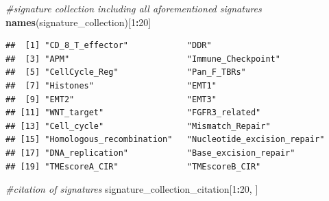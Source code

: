 \documentclass[
  12pt,
]{book}
\newenvironment{Shaded}{\begin{snugshade}}{\end{snugshade}}
\newcommand{\CommentTok}[1]{\textcolor[rgb]{0.56,0.35,0.01}{\textit{#1}}}
\newcommand{\DecValTok}[1]{\textcolor[rgb]{0.00,0.00,0.81}{#1}}
\newcommand{\FunctionTok}[1]{\textcolor[rgb]{0.13,0.29,0.53}{\textbf{#1}}}
\newcommand{\NormalTok}[1]{#1}
\newcommand{\SpecialCharTok}[1]{\textcolor[rgb]{0.81,0.36,0.00}{\textbf{#1}}}
\theoremstyle{definition}
\theoremstyle{definition}
\theoremstyle{definition}
\theoremstyle{definition}
\theoremstyle{remark}
\begin{document}
\begin{Shaded}
\begin{Highlighting}[]
\CommentTok{\#signature collection including all aforementioned signatures }
\FunctionTok{names}\NormalTok{(signature\_collection)[}\DecValTok{1}\SpecialCharTok{:}\DecValTok{20}\NormalTok{]}
\end{Highlighting}
\end{Shaded}

\begin{verbatim}
##  [1] "CD_8_T_effector"            "DDR"                       
##  [3] "APM"                        "Immune_Checkpoint"         
##  [5] "CellCycle_Reg"              "Pan_F_TBRs"                
##  [7] "Histones"                   "EMT1"                      
##  [9] "EMT2"                       "EMT3"                      
## [11] "WNT_target"                 "FGFR3_related"             
## [13] "Cell_cycle"                 "Mismatch_Repair"           
## [15] "Homologous_recombination"   "Nucleotide_excision_repair"
## [17] "DNA_replication"            "Base_excision_repair"      
## [19] "TMEscoreA_CIR"              "TMEscoreB_CIR"
\end{verbatim}

\begin{Shaded}
\begin{Highlighting}[]
\CommentTok{\#citation of signatures}
\NormalTok{signature\_collection\_citation[}\DecValTok{1}\SpecialCharTok{:}\DecValTok{20}\NormalTok{, ]}
\end{Highlighting}
\end{Shaded}
\end{document}
